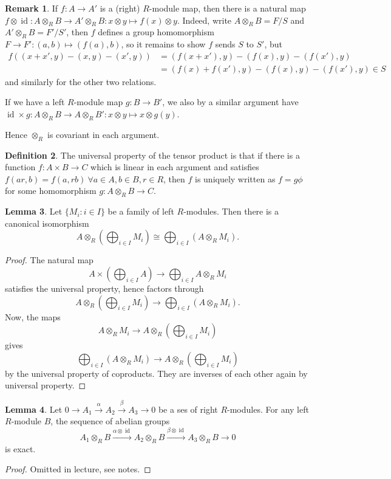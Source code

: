 \documentclass{article}
\newcommand{\id}{\operatorname{id}}
\theoremstyle{definition}
\newtheorem{defn}{Definition}[subsection]
\newtheorem{lemma}[defn]{Lemma}
\newtheorem{remark}[defn]{Remark}
\begin{document}
\begin{remark}
If $f:A\rightarrow A'$ is a (right) $R$-module map, then there is a natural map $f\otimes\id:A\otimes_RB\rightarrow A'\otimes_RB:x\otimes y\mapsto f(x)\otimes y$. Indeed, write $A\otimes_RB=F/S$ and $A'\otimes_RB=F'/S'$, then $f$ defines a group homomorphism $F\rightarrow F':(a,b)\mapsto (f(a),b)$, so it remains to show $f$ sends $S$ to $S'$, but
\[
\begin{aligned}
f((x+x',y)-(x,y)-(x',y))&=(f(x+x'),y)-(f(x),y)-(f(x'),y)\\&=(f(x)+f(x'),y)-(f(x),y)-(f(x'),y)\in S
\end{aligned}
\]
and similarly for the other two relations.

If we have a left $R$-module map $g:B\rightarrow B'$, we also by a similar argument have $\id\times g:A\otimes_RB\rightarrow A\otimes_RB':x\otimes y\mapsto x\otimes g(y)$.

Hence $\otimes_R$ is covariant in each argument.
\end{remark}

\begin{defn}
The universal property of the tensor product is that if there is a function $f:A\times B\rightarrow C$ which is linear in each argument and satisfies $f(ar,b)=f(a,rb) \ \forall a\in A,b\in B,r\in R$, then $f$ is uniquely written as $f=g\phi$ for some homomorphism $g:A\otimes_RB\rightarrow C$.
\end{defn}

\begin{lemma}
\label{lemma:tensproddistrib}
Let $\{M_i:i\in I\}$ be a family of left $R$-modules. Then there is a canonical isomorphism
\[
A\otimes_R \left(\bigoplus_{i\in I}M_i\right)\cong\bigoplus_{i\in I} \left(A\otimes_R M_i\right).
\]
\end{lemma}
\begin{proof}
The natural map
\[
A\times \left(\bigoplus_{i\in I}A\right)\rightarrow\bigoplus_{i\in I}A\otimes_RM_i
\]
satisfies the universal property, hence factors through
\[
A\otimes_R \left(\bigoplus_{i\in I}M_i\right)\rightarrow\bigoplus_{i\in I} \left(A\otimes_R M_i\right).
\]
Now, the maps
\[
A\otimes_RM_i\rightarrow A\otimes_R\left(\bigoplus_{i\in I}M_i\right)
\]
gives
\[
\bigoplus_{i\in I}\left(A\otimes_RM_i\right)\rightarrow A\otimes_R \left(\bigoplus_{i\in I}M_i\right)
\]
by the universal property of coproducts. They are inverses of each other again by universal property.
\end{proof}

\begin{lemma}
Let $0\rightarrow A_1\xrightarrow{\alpha}A_2\xrightarrow{\beta}A_3\rightarrow 0$ be a ses of right $R$-modules. For any left $R$-module $B$, the sequence of abelian groups
\[
A_1\otimes_R B\xrightarrow{\alpha\otimes\id} A_2\otimes_R B\xrightarrow{\beta\otimes\id} A_3\otimes_R B\rightarrow 0
\]
is exact.
\end{lemma}
\begin{proof}
Omitted in lecture, see notes.
\end{proof}
\end{document}

